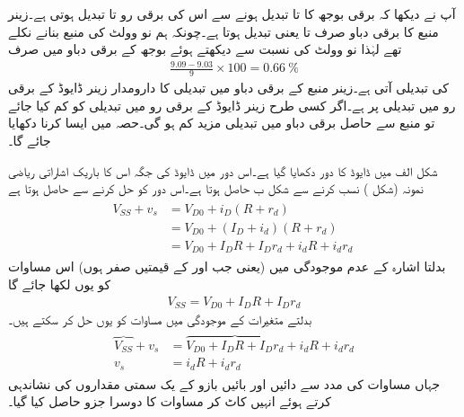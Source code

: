 آپ نے دیکھا کہ برقی بوجھ کا  تا  تبدیل ہونے سے اس کی برقی رو  تا   تبدیل ہوتی ہے۔زینر منبع کا برقی دباو صرف  تا  یعنی  تبدیل ہوتا ہے۔چونکہ ہم نو وولٹ کی منبع بنانے نکلے تھے لہٰذا نو وولٹ کی نسبت سے دیکھتے ہوئے بوجھ کے برقی دباو  میں صرف
\begin{align*}
\frac{9.09-9.03}{9} \times 100=\SI{0.66}{\percent}
\end{align*}
کی تبدیلی آتی ہے۔زینر منبع کے برقی دباو میں تبدیلی کا دارومدار زینر ڈایوڈ کے برقی رو میں تبدیلی پر ہے۔اگر کسی طرح زینر ڈایوڈ کے برقی رو میں تبدیلی کو کم کیا جائے تو منبع سے حاصل برقی دباو میں تبدیلی مزید کم ہو گی۔حصہ  میں ایسا کرنا دکھایا جائے گا۔

شکل  الف میں ڈایوڈ کا دور دکھایا گیا ہے۔اس دور میں ڈایوڈ کی جگہ اس کا باریک اشاراتی ریاضی نمونہ (شکل 
  ) نسب کرنے سے شکل  ب حاصل ہوتا ہے۔اس دور کو حل کرنے سے حاصل ہوتا ہے
\begin{gather} \label{مساوات_ڈایوڈ_اشارہ_موجود}
\begin{aligned}
V_{SS}+v_s&=V_{D0}+i_D (R+r_d )\\
&=V_{D0}+(I_D+i_d)(R+r_d)\\
&=V_{D0}+I_D R + I_D r_d + i_d R + i_d r_d\
\end{aligned}
\end{gather}
بدلتا اشارہ کے عدم موجودگی میں (یعنی جب   اور  کے قیمتیں صفر ہوں) اس مساوات کو یوں لکھا جائے گا
\begin{align} \label{مساوات_ڈایوڈ_اشارہ_عدم_موجود}
V_{SS}=V_{D0}+I_D R +I_D r_d
\end{align}
بدلتے متغیرات کے موجودگی میں مساوات   کو یوں حل کر سکتے ہیں۔
\begin{gather} \label{مساوات_ڈایوڈ_باریک_اشاراتی_مساوات}
\begin{aligned}
\overbrace{V_{SS}}+v_s &=\overbrace{V_{D0}+I_D R + I_D r_d}+i_d R + i_d r_d\\
v_s &= i_d R + i_d r_d
\end{aligned}
\end{gather}
جہاں مساوات   کی مدد سے دائیں اور بائیں بازو کے یک سمتی مقداروں کی نشاندہی کرتے ہوئے انہیں کاٹ کر مساوات کا دوسرا جزو حاصل کیا گیا۔

